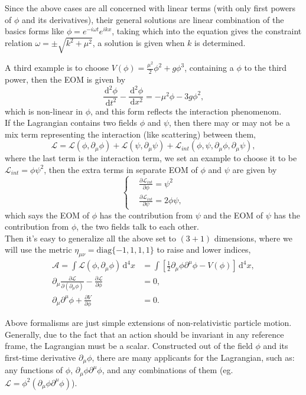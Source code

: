 \documentclass{article}
\newcommand{\be}{\begin{equation}}
\newcommand{\ee}{\end{equation}}
\newcommand{\dif}{\,\mathrm{d}}
\newcommand{\p}{\partial}
\newcommand{\1}{\left}
\newcommand{\2}{\right}
\newcommand{\ma}{\mathcal}
\newcommand{\m}{\mu}
\newcommand{\n}{\nu}
\begin{document}
Since the above cases are all concerned with linear terms (with only first powers of $\phi$ and its derivatives), their general solutions are linear combination of the basics forms like $\phi=e^{-i \omega t} e^{i k x}$, taking which into the equation gives the constraint relation $\omega=\pm\sqrt{k^2+\mu^2}$, a solution is given when $k$ is determined.

A third example is to choose $V(\phi)=\frac{\mu^2}{2} \phi^2+g\phi^3$, containing a $\phi$ to the third power, then the EOM is given by
\be
\frac{\dif^2 \phi}{\dif t^2} - \frac{\dif^2 \phi}{\dif x^2}=-\mu^2 \phi -3g\phi^2,
\ee
which is non-linear in $\phi$, and this form reflects the interaction phenomenom.\\

If the Lagrangian contains two fields $\phi$ and $\psi$, then there may or may not be a mix term representing the interaction (like scattering) between them,
\be
\ma L=\ma L(\phi,\p_\m\phi)+\ma L(\psi,\p_\m\psi)+\ma L_{int}(\phi,\psi,\p_\m\phi,\p_\m\psi),
\ee
where the last term is the interaction term, we set an example to choose it to be $\ma L_{int}=\phi\psi^2$, then the extra terms in separate EOM of $\phi$ and $\psi$ are given by
\be\1\{\begin{split}
&\frac{\p\ma L_{int}}{\p \phi}=\psi^2\\
&\frac{\p\ma L_{int}}{\p \psi}=2\phi\psi,
\end{split}\2.\ee
which says the EOM of $\phi$ has the contribution from $\psi$ and the EOM of $\psi$ has the contribution from $\phi$, the two fields talk to each other.\\

Then it's easy to generalize all the above set to $(3+1)$ dimensions, where we will use the metric $\eta_{\m\n} = \text{diag}\{-1,1,1,1\}$ to raise and lower indices, 
\be
\begin{split}
\ma A = \int \ma L(\phi, \p_\mu \phi) \dif^4 x &= \int \1[\frac1 2 \p_\mu\phi \p^\mu \phi - V(\phi)\2] \dif^4 x,\\
\p_\mu \frac{\p \ma L}{\p (\p_\mu \phi)} - \frac{\p\ma L}{\p \phi} &= 0,\\
\p_\mu\p^\mu \phi+ \frac{\p V}{\p \phi} &= 0.
\end{split}
\ee

Above formalisms are just simple extensions of non-relativistic particle motion. 
Generally, due to the fact that an action should be invariant in any reference frame, the Lagrangian must be a scalar. Constructed out of the field $\phi$ and its first-time derivative $\p_\mu \phi$, there are many applicants for the Lagrangian, such as: any functions of $\phi$, $\p_\mu\phi \p^\mu \phi$, and any combinations of them (eg. $\ma L = \phi^2 (\p_\mu\phi \p^\mu \phi)$).
\end{document}
